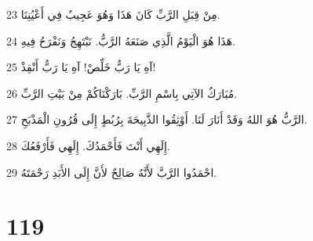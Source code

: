 \par 23 مِنْ قِبَلِ الرَّبِّ كَانَ هَذَا وَهُوَ عَجِيبٌ فِي أَعْيُنِنَا.
\par 24 هَذَا هُوَ الْيَوْمُ الَّذِي صَنَعَهُ الرَّبُّ. نَبْتَهِجُ وَنَفْرَحُ فِيهِ.
\par 25 آهِ يَا رَبُّ خَلِّصْ! آهِ يَا رَبُّ أَنْقِذْ!
\par 26 مُبَارَكٌ الآتِي بِاسْمِ الرَّبِّ. بَارَكْنَاكُمْ مِنْ بَيْتِ الرَّبِّ.
\par 27 الرَّبُّ هُوَ اللهُ وَقَدْ أَنَارَ لَنَا. أَوْثِقُوا الذَّبِيحَةَ بِرُبُطٍ إِلَى قُرُونِ الْمَذْبَحِ.
\par 28 إِلَهِي أَنْتَ فَأَحْمَدُكَ. إِلَهِي فَأَرْفَعُكَ.
\par 29 احْمَدُوا الرَّبَّ لأَنَّهُ صَالِحٌ لأَنَّ إِلَى الأَبَدِ رَحْمَتَهُ.

\chapter{119}

